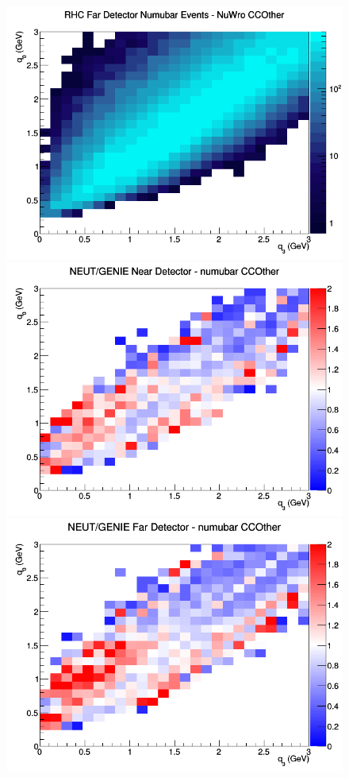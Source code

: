 \begin{figure}[h]
\endminipage
{}
\includegraphics[width=\linewidth]{eff_q0_q3/LAr/CCOther_RHC_FD_numubar_q3_q0_NuWro.png}
\endminipage
\newline
{}
\includegraphics[width=\linewidth]{eff_q0_q3/LAr/ratios/CCOther_NEUT_GENIE_numubar_near_q3_q0.png}
\endminipage
{}
\includegraphics[width=\linewidth]{eff_q0_q3/LAr/ratios/CCOther_NEUT_GENIE_numubar_far_q3_q0.png}

\end{figure}
